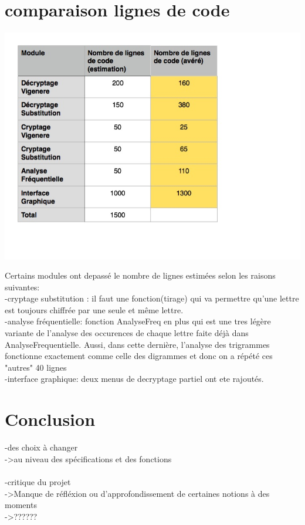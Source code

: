 \documentclass[a4]{article}
\begin{document}
	\section{comparaison lignes de code}
		\begin{center}\includegraphics[scale=0.5]{preview.jpg}\end{center}
		Certains modules ont depassé le nombre de lignes estimées selon les raisons suivantes: \\
		-cryptage substitution : il faut une fonction(tirage) qui va permettre qu'une lettre est toujours chiffrée
		 par une seule et même lettre. \\
		-analyse fréquentielle: fonction AnalyseFreq en plus qui est une tres légère variante de l'analyse des occurences de 
		chaque lettre faite déjà dans AnalyseFrequentielle. Aussi, dans cette dernière, l'analyse des trigrammes fonctionne exactement
		comme celle des digrammes et donc on a répété ces "autres" 40 lignes \\
		-interface graphique: deux menus de decryptage partiel ont ete rajoutés.\\
		
	
	\section{Conclusion}
	-des choix à changer \\
	->au niveau des spécifications et des fonctions \\ \\
	
	-critique du projet \\
	->Manque de réfléxion ou d'approfondissement de certaines notions à des moments \\
	->?????? \\ \\
	
\end{document}
